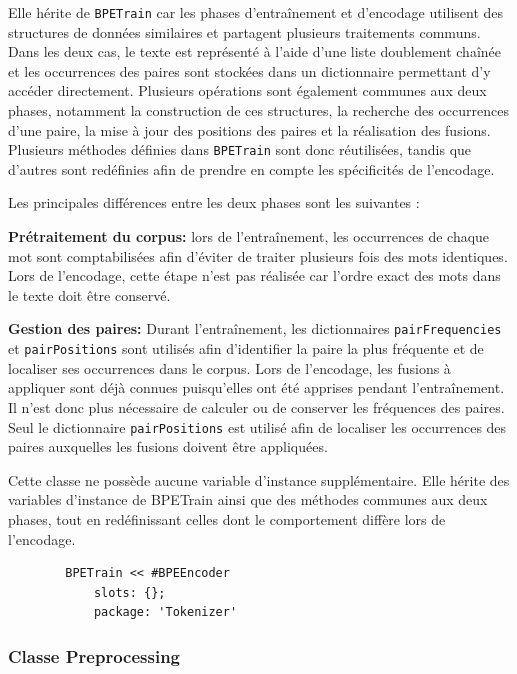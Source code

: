 \documentclass[12pt,a4paper]{report}
\begin{document}
	Elle hérite de \texttt{BPETrain} car les phases d'entraînement et d'encodage utilisent des structures de données similaires et partagent plusieurs traitements communs. Dans les deux cas, le texte est représenté à l’aide d’une liste doublement chaînée et les occurrences des paires sont stockées dans un dictionnaire permettant d'y accéder directement. Plusieurs opérations sont également communes aux deux phases, notamment la construction de ces structures, la recherche des occurrences d’une paire, la mise à jour des positions des paires et la réalisation des fusions. Plusieurs méthodes définies dans \texttt{BPETrain} sont donc réutilisées, tandis que d’autres sont redéfinies afin de prendre en compte les spécificités de l’encodage.
	
	Les principales différences entre les deux phases sont les suivantes :
	
	\begin{itemizeFB}
		\item \textbf{Prétraitement du corpus:} lors de l’entraînement, les occurrences de chaque mot sont comptabilisées afin d’éviter de traiter plusieurs fois des mots identiques. Lors de l’encodage, cette étape n’est pas réalisée car l’ordre exact des mots dans le texte doit être conservé.
		
		\item \textbf{Gestion des paires:} Durant l’entraînement, les dictionnaires \texttt{pairFrequencies} et \texttt{pairPositions} sont utilisés afin d’identifier la paire la plus fréquente et de localiser ses occurrences dans le corpus. Lors de l’encodage, les fusions à appliquer sont déjà connues puisqu’elles ont été apprises pendant l’entraînement. Il n’est donc plus nécessaire de calculer ou de conserver les fréquences des paires. Seul le dictionnaire \texttt{pairPositions} est utilisé afin de localiser les occurrences des paires auxquelles les fusions doivent être appliquées.
	\end{itemizeFB}
	
	Cette classe ne possède aucune variable d’instance supplémentaire. Elle hérite des variables d’instance de BPETrain ainsi que des méthodes communes aux deux phases, tout en redéfinissant celles dont le comportement diffère lors de l’encodage.
	
	\begin{verbatim}
		BPETrain << #BPEEncoder
			slots: {};
			package: 'Tokenizer'
	\end{verbatim}
	
	\subsubsection{Classe Preprocessing}
	
\end{document}
